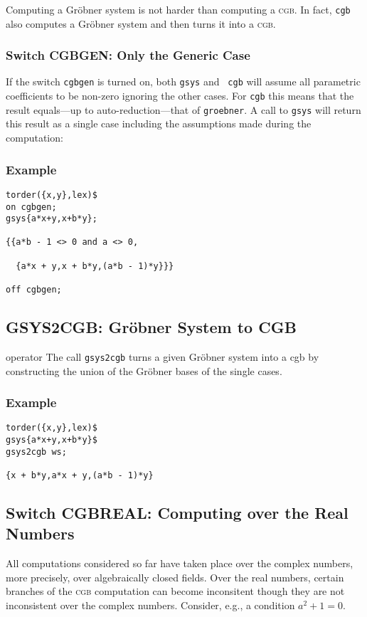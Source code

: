 Computing a Gr\"obner system is not harder than computing a \textsc{cgb}.
In fact, \texttt{cgb} also computes a Gr\"obner system and then turns it
into a \textsc{cgb}.

\subsubsection{Switch CGBGEN: Only the Generic Case}
If the switch \texttt{cgbgen} is turned on, both \texttt{gsys} and {\tt
cgb} will assume all parametric coefficients to be non-zero ignoring
the other cases. For \texttt{cgb} this means that the result equals---up
to auto-reduction---that of \texttt{groebner}. A call to \texttt{gsys} will
return this result as a single case including the assumptions made
during the computation:
%
\subsubsection*{Example}
\begin{verbatim}
torder({x,y},lex)$
on cgbgen;
gsys{a*x+y,x+b*y};

{{a*b - 1 <> 0 and a <> 0,

  {a*x + y,x + b*y,(a*b - 1)*y}}}

off cgbgen;
\end{verbatim}
%
\subsection{GSYS2CGB: Gr\"obner System to CGB}
 {operator}
The call \texttt{gsys2cgb} turns a given Gr\"obner system into a {\sc
cgb} by constructing the union of the Gr\"obner bases of the single
cases.
%
\subsubsection*{Example}
\begin{verbatim}
torder({x,y},lex)$
gsys{a*x+y,x+b*y}$
gsys2cgb ws;

{x + b*y,a*x + y,(a*b - 1)*y}
\end{verbatim}
%
\subsection{Switch CGBREAL: Computing over the Real Numbers}
\label{cgbreal}
All computations considered so far have taken place over the complex
numbers, more precisely, over algebraically closed fields. Over the
real numbers, certain branches of the \textsc{cgb} computation can become
inconsitent though they are not inconsistent over the complex numbers.
Consider, e.g., a condition $a^2+1=0$.

